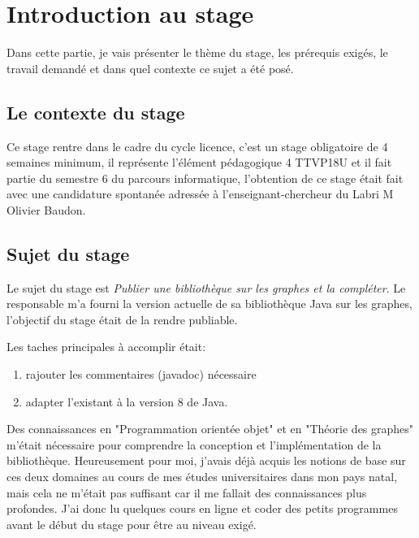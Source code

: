 \documentclass[12pt]{report}
\begin{document}
\chapter{Introduction au stage}

Dans cette partie, je vais présenter le thème du stage, les prérequis exigés, le travail demandé et dans quel contexte ce sujet a été posé.

\section{Le contexte du stage}

Ce stage rentre dans le cadre du cycle licence, c'est un stage obligatoire de 4 semaines minimum, il représente l'élément pédagogique 4 TTVP18U et il fait partie du semestre 6 du parcours informatique, l'obtention de ce stage était fait avec une candidature spontanée adressée à l'enseignant-chercheur du Labri M Olivier Baudon. %

\section{Sujet du stage}

Le sujet du stage est \textit{Publier une bibliothèque sur les graphes et la compléter}. Le responsable m'a fourni la version actuelle de sa bibliothèque Java sur les graphes, l'objectif du stage était de la rendre publiable.\newline

Les taches principales à accomplir était:
\begin{enumerate}
\item rajouter les commentaires (javadoc) nécessaire
\item adapter l'existant à la version 8 de Java.
\end{enumerate}
\newline
Des connaissances en "Programmation orientée objet" et en "Théorie des graphes" m'était nécessaire pour comprendre la conception et l'implémentation de la bibliothèque. Heureusement pour moi, j'avais déjà acquis les notions de base sur ces deux domaines au cours de mes études universitaires dans mon pays natal, mais cela ne m'était pas suffisant car il me fallait des connaissances plus profondes. J'ai donc lu quelques cours en ligne et coder des petits programmes avant le début du stage pour être au niveau exigé. 
\end{document}
